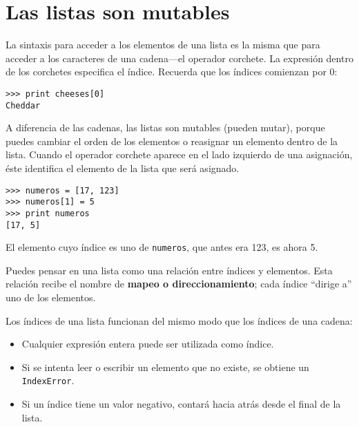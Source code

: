 
\section{Las listas son mutables}


La sintaxis para acceder a los elementos de una lista es la misma que
para acceder a los caracteres de una cadena---el operador corchete. La
expresión dentro de los corchetes especifica el índice. Recuerda que los
índices comienzan por 0:

\beforeverb
\begin{verbatim}
>>> print cheeses[0]
Cheddar
\end{verbatim}
\afterverb
%
A diferencia de las cadenas, las listas son mutables (pueden mutar), porque puedes cambiar el orden
de los elementos o reasignar un elemento dentro de la lista.
Cuando el operador corchete aparece en el lado izquierdo de una asignación,
éste identifica el elemento de la lista que será asignado.


\beforeverb
\begin{verbatim}
>>> numeros = [17, 123]
>>> numeros[1] = 5
>>> print numeros
[17, 5]
\end{verbatim}
\afterverb
%
El elemento cuyo índice es uno de {\tt numeros}, que
antes era 123, es ahora 5.


Puedes pensar en una lista como una relación entre índices y
elementos. Esta relación recibe el nombre de {\bf mapeo o direccionamiento}; cada índice
``dirige a'' uno de los elementos.



Los índices de una lista funcionan del mismo modo que los índices de una cadena:

\begin{itemize}

\item Cualquier expresión entera puede ser utilizada como índice.

\item Si se intenta leer o escribir un elemento que no existe,
se obtiene un {\tt IndexError}.


\item Si un índice tiene un valor negativo, contará hacia atrás desde
el final de la lista.

\end{itemize}

